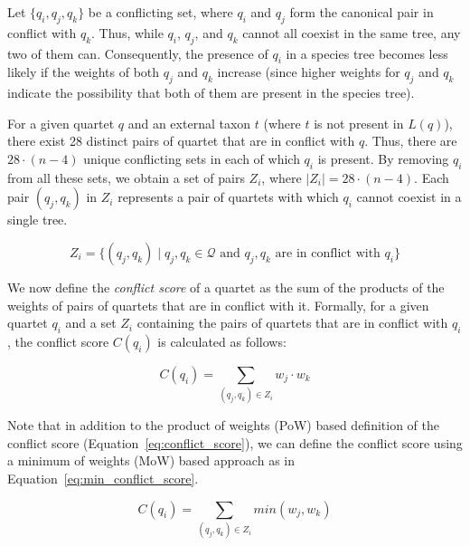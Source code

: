 \documentclass[runningheads]{llncs}
\newcommand{\add}[1]{{\color{blue} #1}}
\begin{document}
Let $ \{q_i, q_j, q_k \} $ be a conflicting set, where $q_i$ and $q_j$ form the canonical pair in conflict with $q_k$. Thus, while $q_i$, $q_j$, and $q_k$ cannot all coexist in the same tree, any two of them can. Consequently, the presence of $q_i$ in a species tree becomes less likely if the weights of both $q_j$ and $q_k$ increase (since higher weights for $q_j$ and $q_k$ indicate the possibility that both of them are present in the species tree). 

\add{{For a given quartet $q$ and an external taxon $t$ (where $t$ is not present in $L(q)$), there exist 28 distinct pairs of quartet that are in conflict with $q$}. Thus, there are $28 \cdot (n - 4)$ unique conflicting sets in each of which $q_i$ is present. By removing  $q_i$ from all these sets, we obtain a set of pairs $Z_i$, where $|Z_i| = 28 \cdot (n-4)$. }
Each pair $(q_j, q_k)$ in $Z_i$ represents a pair of quartets with which $q_i$ cannot coexist in a single tree. 


$$
Z_i = \{(q_j, q_k) \mid q_j, q_k \in \mathcal{Q} \text{ and } q_j, q_k \text{ are in conflict with } q_i\}
$$

We now define the \textit{conflict score} of a quartet as the sum of the products of the weights of pairs of quartets that are in conflict with it. Formally, for a given quartet $q_i$ and a set $Z_i$ containing the pairs of quartets that are in conflict with $q_i$, the conflict score $C(q_i)$ is calculated as follows:

\vspace{-10pt}
\begin{equation}
\label{eq:conflict_score}
C(q_i) = \sum_{(q_j, q_k) \in Z_i} w_j \cdot w_k
\end{equation}

%


Note that in addition to the product of weights (PoW) based definition of the conflict score (Equation~\ref{eq:conflict_score}), we can define the conflict score using a minimum of weights (MoW) based approach as in Equation~\ref{eq:min_conflict_score}. %

\begin{equation}
\label{eq:min_conflict_score}
C(q_i) = \sum_{(q_j, q_k) \in Z_i} min(w_j , w_k)
\end{equation}
\end{document}
